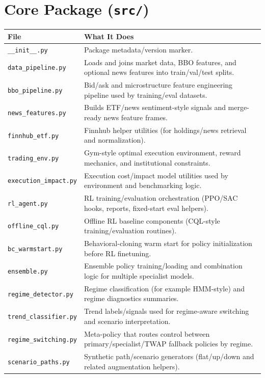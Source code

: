 \documentclass[11pt]{article}
\begin{document}
\section{Core Package (\texttt{src/})}
\begin{longtable}{>{\raggedright\arraybackslash}p{} >{\raggedright\arraybackslash}p{}}
\textbf{File} & \textbf{What It Does} \\
\hline
\texttt{\_\_init\_\_.py} & Package metadata/version marker. \\
\texttt{data\_pipeline.py} & Loads and joins market data, BBO features, and optional news features into train/val/test splits. \\
\texttt{bbo\_pipeline.py} & Bid/ask and microstructure feature engineering pipeline used by training/eval datasets. \\
\texttt{news\_features.py} & Builds ETF/news sentiment-style signals and merge-ready news feature frames. \\
\texttt{finnhub\_etf.py} & Finnhub helper utilities (for holdings/news retrieval and normalization). \\
\texttt{trading\_env.py} & Gym-style optimal execution environment, reward mechanics, and institutional constraints. \\
\texttt{execution\_impact.py} & Execution cost/impact model utilities used by environment and benchmarking logic. \\
\texttt{rl\_agent.py} & RL training/evaluation orchestration (PPO/SAC hooks, reports, fixed-start eval helpers). \\
\texttt{offline\_cql.py} & Offline RL baseline components (CQL-style training/evaluation routines). \\
\texttt{bc\_warmstart.py} & Behavioral-cloning warm start for policy initialization before RL finetuning. \\
\texttt{ensemble.py} & Ensemble policy training/loading and combination logic for multiple specialist models. \\
\texttt{regime\_detector.py} & Regime classification (for example HMM-style) and regime diagnostics summaries. \\
\texttt{trend\_classifier.py} & Trend labels/signals used for regime-aware switching and scenario interpretation. \\
\texttt{regime\_switching.py} & Meta-policy that routes control between primary/specialist/TWAP fallback policies by regime. \\
\texttt{scenario\_paths.py} & Synthetic path/scenario generators (flat/up/down and related augmentation helpers). \\

\end{longtable}
\end{document}
